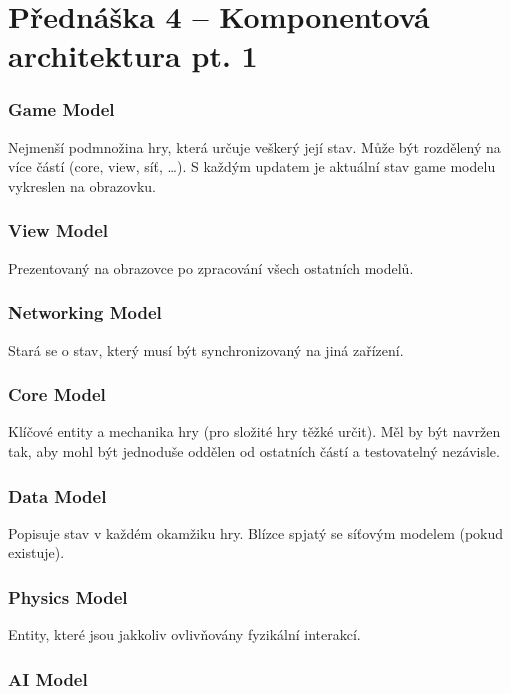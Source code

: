 \section{Přednáška 4 -- Komponentová architektura pt. 1}

\subsubsection*{Game Model}

Nejmenší podmnožina hry, která určuje veškerý její stav.
Může být rozdělený na více částí (core, view, síť, \dots).
S každým updatem je aktuální stav game modelu vykreslen na obrazovku.

\subsubsection*{View Model}

Prezentovaný na obrazovce po zpracování všech ostatních modelů.

\subsubsection*{Networking Model}

Stará se o stav, který musí být synchronizovaný na jiná zařízení.

\subsubsection*{Core Model}

Klíčové entity a mechanika hry (pro složité hry těžké určit).
Měl by být navržen tak, aby mohl být jednoduše oddělen od ostatních částí a testovatelný nezávisle.

\subsubsection*{Data Model}

Popisuje stav v každém okamžiku hry.
Blízce spjatý se síťovým modelem (pokud existuje).

\subsubsection*{Physics Model}

Entity, které jsou jakkoliv ovlivňovány fyzikální interakcí.

\subsubsection*{AI Model}

